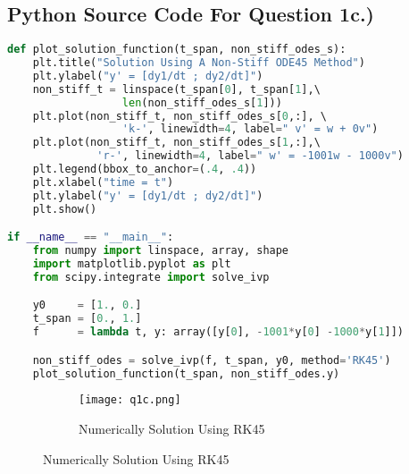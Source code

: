 \documentclass{article}
\begin{document}
\subsection*{Python Source Code For Question 1c.)}
\begin{lstlisting}[language=Python]
def plot_solution_function(t_span, non_stiff_odes_s):
    plt.title("Solution Using A Non-Stiff ODE45 Method")
    plt.ylabel("y' = [dy1/dt ; dy2/dt]")
    non_stiff_t = linspace(t_span[0], t_span[1],\ 
                  len(non_stiff_odes_s[1]))
    plt.plot(non_stiff_t, non_stiff_odes_s[0,:], \ 
                  'k-', linewidth=4, label=" v' = w + 0v")
    plt.plot(non_stiff_t, non_stiff_odes_s[1,:],\ 
              'r-', linewidth=4, label=" w' = -1001w - 1000v")
    plt.legend(bbox_to_anchor=(.4, .4))
    plt.xlabel("time = t")
    plt.ylabel("y' = [dy1/dt ; dy2/dt]")
    plt.show()

if __name__ == "__main__":
    from numpy import linspace, array, shape
    import matplotlib.pyplot as plt
    from scipy.integrate import solve_ivp

    y0     = [1., 0.]
    t_span = [0., 1.]
    f      = lambda t, y: array([y[0], -1001*y[0] -1000*y[1]])

    non_stiff_odes = solve_ivp(f, t_span, y0, method='RK45')
    plot_solution_function(t_span, non_stiff_odes.y)
\end{lstlisting}
\begin{figure}[h!]
  \centering
  \begin{subfigure}{\linewidth}
    \texttt{[image: q1c.png]}
    \caption{Numerically Solution Using RK45}
  \end{subfigure}
\end{figure}
\pagebreak
\end{document}
